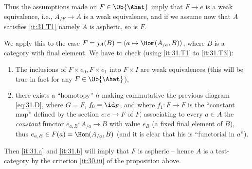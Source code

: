 Thus the assumptions made on $F\in\Ob{\Ahat}$ imply that $F \to
e$ is a weak equivalence, i.e., $A_{/F} \to A$ is a weak equivalence,
and if we assume now that $A$ satisfies \ref{it:31.T1} namely $A$ is
aspheric, so is $F$.

We apply this to the case $F = j_A(B) = (a \mapsto \Hom(A_{/a},B))$,
where $B$ is a category with final element. We have to check (using
\ref{it:31.T1} to \ref{it:31.T3}):
\begin{enumerate}[label=(\alph*)]
\item\label{it:31.a}
  The inclusions of $F\times e_0, F\times e_1$ into $F\times I$
  are weak equivalences (this will be true in fact for any
  $F\in\Ob{\Ahat}$),
\item\label{it:31.b}
  there exists a ``homotopy'' $h$ making commutative the previous
  diagram \eqref{eq:31.D}, where $G=F$, $f_0=\id_F$, and where $f_1:
  F\to F$ is the ``constant map'' defined by the section $c : e\to F$
  of $F$, associating to every $a\in A$ the \emph{constant} functor
  $e_{a,B} : A_{/a}\to B$ with value $e_B$ (a fixed final element of
  $B$), thus $e_{a,B}\in F(a) = \Hom(A_{/a},B)$ (and it is clear that
  his is ``functorial in $a$'').
\end{enumerate}
Then \ref{it:31.a} and \ref{it:31.b} will imply that $F$ is aspheric
-- hence $A$ is a test-category by the criterion \ref{it:30.iii} of
the proposition above.

